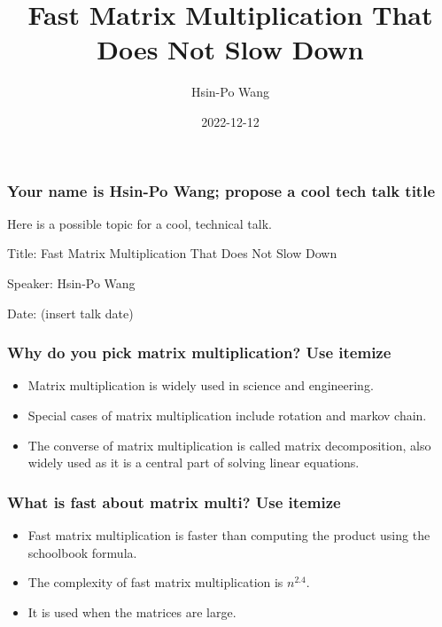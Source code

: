 \documentclass[aspectratio=169, t]{beamer}
\title{Fast Matrix Multiplication That Does Not Slow Down}
\author{Hsin-Po Wang}
\institute{University of California, Berkeley}
\date{2022-12-12}
\begin{document}
\makeatletter

\begin{frame}
	\frametitle{Your name is Hsin-Po Wang; propose a cool tech talk title}

	Here is a possible topic for a cool, technical talk.

	Title: Fast Matrix Multiplication That Does Not Slow Down

	Speaker: Hsin-Po Wang

	Date: (insert talk date)
\end{frame}

\begin{frame}
	\frametitle{Why do you pick matrix multiplication?  Use itemize}

	\begin{itemize}
		\item Matrix multiplication is widely used in science and engineering.

		\item Special cases of matrix multiplication
			include rotation and markov chain.

		\item The converse of matrix multiplication
			is called matrix decomposition, also widely used
			as it is a central part of solving linear equations.
	\end{itemize}
\end{frame}

\begin{frame}
	\frametitle{What is fast about matrix multi?  Use itemize}

	\begin{itemize}
		\item Fast matrix multiplication is faster than
			computing the product using the schoolbook formula.
		\item The complexity of fast matrix multiplication is $n^{2.4}$.

		\item It is used when the matrices are large.
	\end{itemize}
\end{frame}
\end{document}
